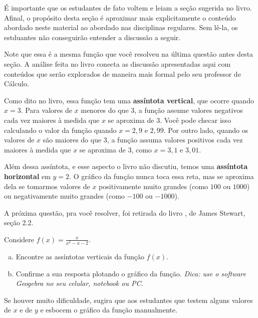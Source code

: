 \documentclass[main.tex]{subfiles}
\begin{document}
É importante que os estudantes de fato voltem e leiam a seção sugerida no livro. Afinal, o propósito desta seção é aproximar mais explicitamente o conteúdo abordado neste material ao abordado nas disciplinas regulares. Sem lê-la, os estduantes não conseguirão entender a discussão a seguir.

\paraAmbos

Note que essa é a mesma função que você resolveu na última questão antes desta seção. A análise feita no livro conecta as discussão apresentadas aqui com conteúdos que serão explorados de maneira mais formal pelo seu professor de Cálculo.

Como dito no livro, essa função tem uma \textbf{assíntota vertical}, que ocorre quando $x=3$. Para valores de $x$ menores do que 3, a função assume valores negativos cada vez maiores à medida que $x$ se aproxima de $3$. Você pode checar isso calculando o valor da função quando $x=2,9$ e $2,99$. Por outro lado, quando os valores de $x$ são maiores do que $3$, a função assuma valores positivos cada vez maiores à medida que $x$ se aproxima de $3$, como $x=3,1$ e $3,01$.

Além dessa assíntota, e esse aspecto o livro não discutiu, temos uma \textbf{assíntota horizontal} em $y=2$. O gráfico da função nunca toca essa reta, mas se aproxima dela se tomarmos valores de $x$ positivamente muito grandes (como $100$ ou $1000$) ou negativamente muito grandes (como $-100$ ou $-1000$).

A próxima questão, pra você resolver, foi retirada do livro , de James Stewart, seção 2.2.

\begin{resolva}
Considere $f(x)=\frac{x}{x^2-x-2}$.
\begin{enumerate}[a)]
 \item Encontre as assíntotas verticais da função $f(x)$.
 \item Confirme a sua resposta plotando o gráfico da função. \textit{Dica: use o software Geogebra no seu celular, notebook ou PC.}
\end{enumerate}
\end{resolva}

\paraTutores

Se houver muito dificuldade, sugira que aos estudantes que testem alguns valores de $x$ e de $y$ e esbocem o gráfico da função manualmente.

\paraAmbos
\end{document}
